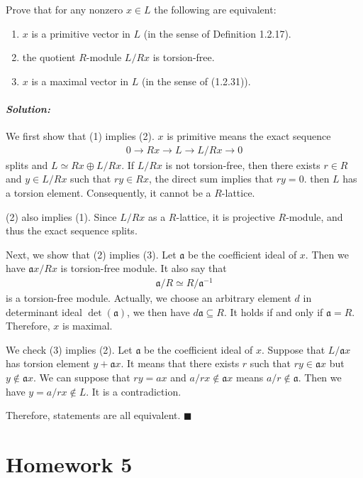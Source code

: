 \documentclass[12pt, a4paper]{article}
\newenvironment{solution}
  {\paragraph{\textit{Solution:}}\par\medskip}
  {\hfill$\blacksquare$\vspace{0.1cm}}
\begin{document}
Prove that for any nonzero $x \in L$ the following are equivalent:
\begin{enumerate}
    \item $x$ is a primitive vector in $L$ (in the sense of Definition 1.2.17).
    \item the quotient $R$-module $L/Rx$ is torsion-free.
    \item $x$ is a maximal vector in $L$ (in the sense of (1.2.31)).
\end{enumerate}
\begin{solution}
    We first show that (1) implies (2). $x$ is primitive means the exact sequence 
    \begin{align*}
        0\to Rx \to L \to L/Rx\to 0 
    \end{align*}
    splits and $L\simeq Rx\oplus L/Rx$. If $L/Rx$ is not torsion-free,
    then there exists $r\in R$ and $y\in L/Rx$ such that $ry\in Rx$, the direct sum implies that $ry=0$. 
    then $L$ has a torsion element. Consequently, it cannot be a $R$-lattice.

    (2) also implies (1). Since $L/Rx$ as a $R$-lattice, it is projective $R$-module, and thus the exact sequence splits.

    Next, we show that (2) implies (3). Let $\mathfrak{a}$ be the coefficient ideal of $x$. Then we have $\mathfrak{a}x/Rx$ is torsion-free module.
    It also say that 
    \begin{align*}
        \mathfrak{a}/R \simeq R/\mathfrak{a}^{-1}
    \end{align*}
    is a torsion-free module. Actually, we choose an arbitrary element $d$ in determinant ideal $\det(\mathfrak{a})$, we then have $d\mathfrak{a}\subseteq R$.
    It holds if and only if $\mathfrak{a}=R$.
    Therefore, $x$ is maximal.

    We check (3) implies (2). Let $\mathfrak{a}$ be the coefficient ideal of $x$. Suppose that $L/\mathfrak{a}x$ has torsion element $y+\mathfrak{a}x$.
    It means that there exists $r$ such that $ry \in \mathfrak{a}x$ but $y\notin \mathfrak{a}x$.
    We can suppose that $ry = ax$ and $a/r x\notin \mathfrak{a}x$ means $a/r\notin \mathfrak{a}$. Then we have $y = a/r x\notin L$.
    It is a contradiction.

    Therefore, statements are all equivalent.
\end{solution}

\section*{Homework 5}
\end{document}
